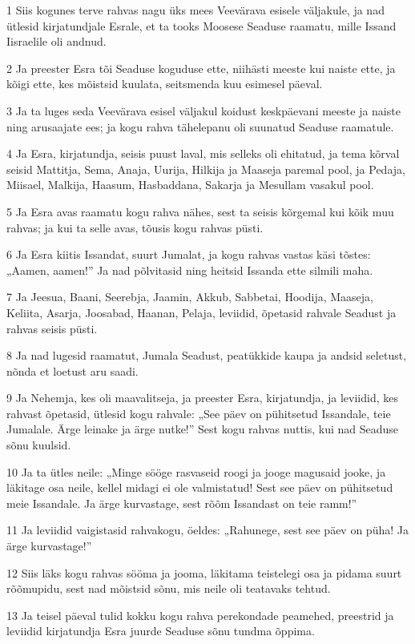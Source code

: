 \par 1 Siis kogunes terve rahvas nagu üks mees Veevärava esisele väljakule, ja nad ütlesid kirjatundjale Esrale, et ta tooks Moosese Seaduse raamatu, mille Issand Iisraelile oli andnud.
\par 2 Ja preester Esra tõi Seaduse koguduse ette, niihästi meeste kui naiste ette, ja kõigi ette, kes mõistsid kuulata, seitsmenda kuu esimesel päeval.
\par 3 Ja ta luges seda Veevärava esisel väljakul koidust keskpäevani meeste ja naiste ning arusaajate ees; ja kogu rahva tähelepanu oli suunatud Seaduse raamatule.
\par 4 Ja Esra, kirjatundja, seisis puust laval, mis selleks oli ehitatud, ja tema kõrval seisid Mattitja, Sema, Anaja, Uurija, Hilkija ja Maaseja paremal pool, ja Pedaja, Miisael, Malkija, Haasum, Hasbaddana, Sakarja ja Mesullam vasakul pool.
\par 5 Ja Esra avas raamatu kogu rahva nähes, sest ta seisis kõrgemal kui kõik muu rahvas; ja kui ta selle avas, tõusis kogu rahvas püsti.
\par 6 Ja Esra kiitis Issandat, suurt Jumalat, ja kogu rahvas vastas käsi tõstes: „Aamen, aamen!” Ja nad põlvitasid ning heitsid Issanda ette silmili maha.
\par 7 Ja Jeesua, Baani, Seerebja, Jaamin, Akkub, Sabbetai, Hoodija, Maaseja, Keliita, Asarja, Joosabad, Haanan, Pelaja, leviidid, õpetasid rahvale Seadust ja rahvas seisis püsti.
\par 8 Ja nad lugesid raamatut, Jumala Seadust, peatükkide kaupa ja andsid seletust, nõnda et loetust aru saadi.
\par 9 Ja Nehemja, kes oli maavalitseja, ja preester Esra, kirjatundja, ja leviidid, kes rahvast õpetasid, ütlesid kogu rahvale: „See päev on pühitsetud Issandale, teie Jumalale. Ärge leinake ja ärge nutke!” Sest kogu rahvas nuttis, kui nad Seaduse sõnu kuulsid.
\par 10 Ja ta ütles neile: „Minge sööge rasvaseid roogi ja jooge magusaid jooke, ja läkitage osa neile, kellel midagi ei ole valmistatud! Sest see päev on pühitsetud meie Issandale. Ja ärge kurvastage, sest rõõm Issandast on teie ramm!”
\par 11 Ja leviidid vaigistasid rahvakogu, öeldes: „Rahunege, sest see päev on püha! Ja ärge kurvastage!”
\par 12 Siis läks kogu rahvas sööma ja jooma, läkitama teistelegi osa ja pidama suurt rõõmupidu, sest nad mõistsid sõnu, mis neile oli teatavaks tehtud.
\par 13 Ja teisel päeval tulid kokku kogu rahva perekondade peamehed, preestrid ja leviidid kirjatundja Esra juurde Seaduse sõnu tundma õppima.
